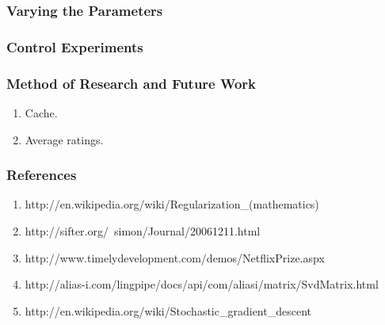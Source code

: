 \documentclass[12pt]{article}
\begin{document}
\subsubsection*{Varying the Parameters}

\subsubsection*{Control Experiments}

\subsubsection*{Method of Research and Future Work}
\begin{enumerate}
\item Cache.
\item Average ratings.
\end{enumerate}

\subsubsection*{References}
\begin{enumerate}
  \item http://en.wikipedia.org/wiki/Regularization\_(mathematics)
  \item http://sifter.org/~simon/Journal/20061211.html
  \item http://www.timelydevelopment.com/demos/NetflixPrize.aspx
  \item http://alias-i.com/lingpipe/docs/api/com/aliasi/matrix/SvdMatrix.html
  \item http://en.wikipedia.org/wiki/Stochastic\_gradient\_descent
\end{enumerate}
\end{document}
